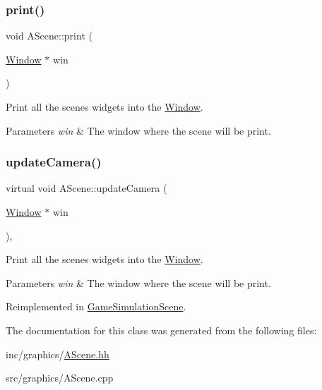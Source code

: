 \mbox{\label{classAScene_ae5d7463a823ed64f3846b5847340b68c}} 
\subsubsection{\texorpdfstring{print()}{print()}}
{\footnotesize\ttfamily void A\+Scene\+::print (\begin{DoxyParamCaption}\item[{\hyperlink{classWindow}{Window} $\ast$}]{win }\end{DoxyParamCaption})}



Print all the scene\textquotesingle{}s widgets into the \hyperlink{classWindow}{Window}. 


\begin{DoxyParams}{Parameters}
{\em win} & The window where the scene will be print. \\
\hline
\end{DoxyParams}
\mbox{\label{classAScene_a18070899d965f1811c2253ad1d939374}} 
\subsubsection{\texorpdfstring{update\+Camera()}{updateCamera()}}
{\footnotesize\ttfamily virtual void A\+Scene\+::update\+Camera (\begin{DoxyParamCaption}\item[{\hyperlink{classWindow}{Window} $\ast$}]{win }\end{DoxyParamCaption})\hspace{0.3cm}{\ttfamily [inline]}, {\ttfamily [virtual]}}



Print all the scene\textquotesingle{}s widgets into the \hyperlink{classWindow}{Window}. 


\begin{DoxyParams}{Parameters}
{\em win} & The window where the scene will be print. \\
\hline
\end{DoxyParams}


Reimplemented in \hyperlink{classGameSimulationScene_a66b107f708b5eed87a3c0a0016541d29}{Game\+Simulation\+Scene}.



The documentation for this class was generated from the following files\+:\begin{DoxyCompactItemize}
\item 
inc/graphics/\hyperlink{AScene_8hh}{A\+Scene.\+hh}\item 
src/graphics/A\+Scene.\+cpp\end{DoxyCompactItemize}
